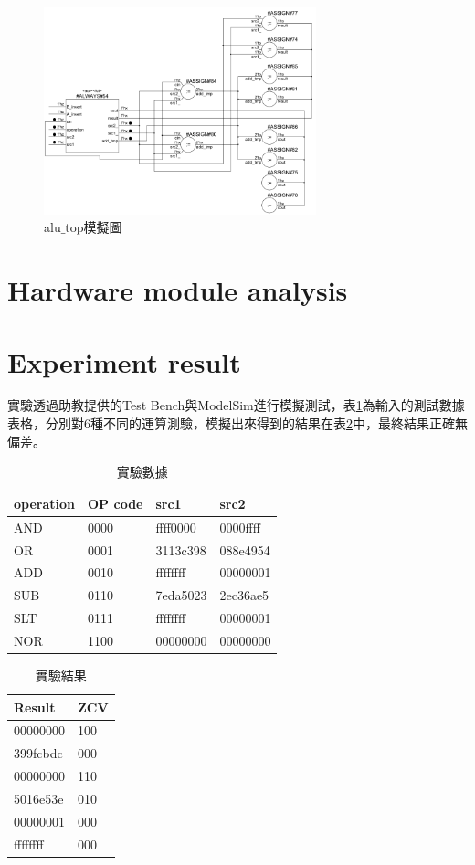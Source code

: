 \documentclass[12pt,a4paper]{article}
\theoremstyle{definition}
\begin{document}
\begin{figure}[H]
\centering
\includegraphics[height=6cm]{fig/alu_top.png}
\caption{alu$\_$top模擬圖}
\label{fig:alu_top}
\end{figure}


\section{Hardware module analysis}

\section{Experiment result}

實驗透過助教提供的Test Bench與ModelSim進行模擬測試，表\ref{tab:data}為輸入的測試數據表格，分別對6種不同的運算測驗，模擬出來得到的結果在表\ref{tab:result}中，最終結果正確無偏差。
\begin{table}[H]
\centering
\caption
{實驗數據}
\label{tab:data}
\begin{tabular}{llll} \toprule
operation & OP code & src1 & src2 \\
\midrule
AND & 0000 & ffff0000 & 0000ffff
\\
OR & 0001 & 3113c398 & 088e4954
\\
ADD & 0010 & ffffffff & 00000001
\\
SUB & 0110 & 7eda5023 & 2ec36ae5
\\
SLT & 0111 & ffffffff & 00000001
\\
NOR & 1100 & 00000000 & 00000000
\\ \bottomrule
\end{tabular}
\end{table}

\begin{table}[H]
\centering
\caption
{實驗結果}
\label{tab:result}
\begin{tabular}{ll} \toprule
Result & ZCV \\
\midrule
00000000 & 100
\\
399fcbdc & 000
\\
00000000 & 110
\\
5016e53e & 010
\\
00000001 & 000
\\
ffffffff & 000
\\ \bottomrule
\end{tabular}
\end{table}
\end{document}
